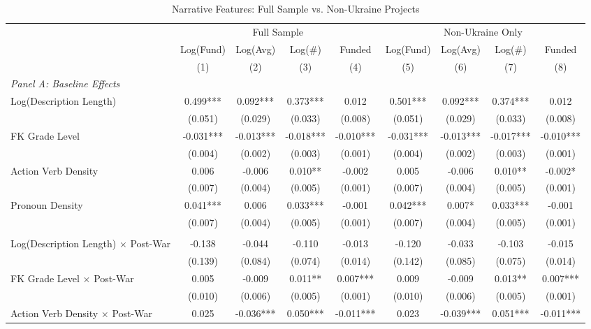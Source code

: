 \begin{table}[htbp]
\centering
\caption{Narrative Features: Full Sample vs. Non-Ukraine Projects}
\label{tab:narrative}
\begin{threeparttable}
\small
\begin{tabular}{lcccccccc}
\toprule
& \multicolumn{4}{c}{Full Sample} & \multicolumn{4}{c}{Non-Ukraine Only} \\
\cmidrule(lr){2-5} \cmidrule(lr){6-9}
& Log(Fund) & Log(Avg) & Log(\#) & Funded & Log(Fund) & Log(Avg) & Log(\#) & Funded \\
& (1) & (2) & (3) & (4) & (5) & (6) & (7) & (8) \\
\midrule
\multicolumn{9}{l}{\textit{Panel A: Baseline Effects}} \\
Log(Description Length) & 0.499*** & 0.092*** & 0.373*** & 0.012 & 0.501*** & 0.092*** & 0.374*** & 0.012 \\
& (0.051) & (0.029) & (0.033) & (0.008) & (0.051) & (0.029) & (0.033) & (0.008) \\
FK Grade Level & -0.031*** & -0.013*** & -0.018*** & -0.010*** & -0.031*** & -0.013*** & -0.017*** & -0.010*** \\
& (0.004) & (0.002) & (0.003) & (0.001) & (0.004) & (0.002) & (0.003) & (0.001) \\
Action Verb Density & 0.006 & -0.006 & 0.010** & -0.002 & 0.005 & -0.006 & 0.010** & -0.002* \\
& (0.007) & (0.004) & (0.005) & (0.001) & (0.007) & (0.004) & (0.005) & (0.001) \\
Pronoun Density & 0.041*** & 0.006 & 0.033*** & -0.001 & 0.042*** & 0.007* & 0.033*** & -0.001 \\
& (0.007) & (0.004) & (0.005) & (0.001) & (0.007) & (0.004) & (0.005) & (0.001) \\
\addlinespace
\multicolumn{9}{l}{\textit{Panel B: Post-War Interactions}} \\
Log(Description Length) $\times$ Post-War & -0.138 & -0.044 & -0.110 & -0.013 & -0.120 & -0.033 & -0.103 & -0.015 \\
& (0.139) & (0.084) & (0.074) & (0.014) & (0.142) & (0.085) & (0.075) & (0.014) \\
FK Grade Level $\times$ Post-War & 0.005 & -0.009 & 0.011** & 0.007*** & 0.009 & -0.009 & 0.013** & 0.007*** \\
& (0.010) & (0.006) & (0.005) & (0.001) & (0.010) & (0.006) & (0.005) & (0.001) \\
Action Verb Density $\times$ Post-War & 0.025 & -0.036*** & 0.050*** & -0.011*** & 0.023 & -0.039*** & 0.051*** & -0.011*** \\

\end{tabular}
\end{threeparttable}
\end{table}
